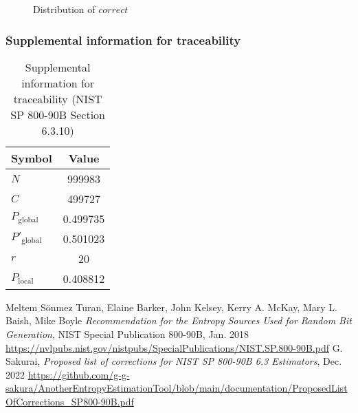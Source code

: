 \documentclass[a3paper,xelatex,english]{bxjsarticle}
\begin{document}
\begin{figure}[htbp]
\centering

\caption{Distribution of $correct$}
\end{figure}
\subsubsection{Supplemental information for traceability}
\renewcommand{\arraystretch}{1.8}
\begin{table}[h]
\caption{Supplemental information for traceability (NIST SP 800-90B Section 6.3.10)}
\begin{center}
\begin{tabular}{|l|c|}
\hline 
\rowcolor{anotherlightblue} %
Symbol				& Value \\ \hline 
$N$				& 999983\\ \hline 
$C$				& 499727\\ \hline 
$P_{\textrm{global}}$				& 0.499735\\ \hline 
$P'_{\textrm{global}}$			& 0.501023\\ \hline 
$r$				& 20\\ \hline 
$P_{\textrm{local}}$ 			& 0.408812\\ \hline
\end{tabular}
\end{center}
\end{table}
\renewcommand{\arraystretch}{1.4}
\begin{thebibliography}{99}
Meltem S\"{o}nmez Turan,
Elaine Barker,
John Kelsey,
Kerry A. McKay,
Mary L. Baish,
Mike Boyle
\textit{Recommendation for the Entropy Sources Used for Random Bit Generation},
NIST Special Publication 800-90B, Jan. 2018 
\url{https://nvlpubs.nist.gov/nistpubs/SpecialPublications/NIST.SP.800-90B.pdf}
G. Sakurai, \textit{Proposed list of corrections for NIST SP 800-90B 6.3 Estimators}, Dec. 2022 
\url{https://github.com/g-g-sakura/AnotherEntropyEstimationTool/blob/main/documentation/ProposedListOfCorrections_SP800-90B.pdf}
\end{thebibliography}
\end{document}
